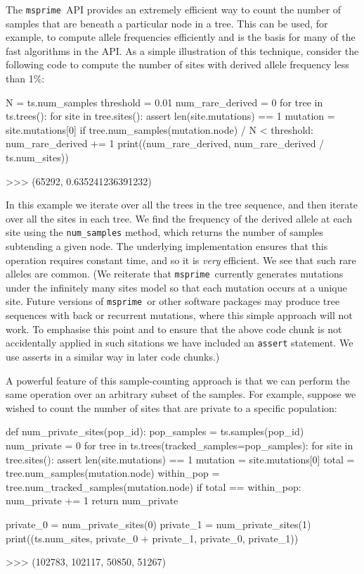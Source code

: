 \documentclass[graybox]{svmult}
\newcommand{\msprime}[0]{\texttt{msprime}}
\begin{document}
The \msprime\ API provides an extremely efficient way to count the number of samples that are beneath a particular node in a tree. This can be used,
for example, to compute allele frequencies efficiently and is the basis
for many of the fast algorithms in the API. As a simple illustration of
this technique, consider the following code to compute the number of
sites with derived allele frequency less than 1\%:

\begin{pythoncode}
N = ts.num_samples
threshold = 0.01
num_rare_derived = 0
for tree in ts.trees():
    for site in tree.sites():
        assert len(site.mutations) == 1
        mutation = site.mutations[0]
        if tree.num_samples(mutation.node) / N < threshold:
            num_rare_derived += 1
print((num_rare_derived, num_rare_derived / ts.num_sites))

>>> (65292, 0.635241236391232)
\end{pythoncode}

    In this example we iterate over all the trees in the tree sequence, and
then iterate over all the sites in each tree. We find the frequency
of the derived allele at each site using the \texttt{num\_samples}
method, which returns the number of samples subtending a given
node. The underlying implementation ensures that this operation requires
constant time, and so it is \emph{very} efficient. We see that such rare alleles are common.
(We reiterate that \msprime\ currently
generates mutations under the infinitely many sites model so that each mutation occurs at a
unique site. Future versions of \msprime\ or other software packages may produce
tree sequences with back or recurrent mutations, where
this simple approach will not work.
To emphasise this point and to ensure that the above code chunk is not
accidentally applied in such sitations we have included an
\texttt{assert} statement. We use asserts in a similar way in later
code chunks.)

A powerful feature of this sample-counting approach is that we can
perform the same operation over an arbitrary subset of the samples. For
example, suppose we wished to count the number of sites that are private
to a specific population:

\begin{pythoncode}
def num_private_sites(pop_id):
    pop_samples = ts.samples(pop_id)
    num_private = 0
    for tree in ts.trees(tracked_samples=pop_samples):
        for site in tree.sites():
            assert len(site.mutations) == 1
            mutation = site.mutations[0]
            total = tree.num_samples(mutation.node)
            within_pop = tree.num_tracked_samples(mutation.node)
            if total == within_pop:
                num_private += 1
    return num_private

private_0 = num_private_sites(0)
private_1 = num_private_sites(1)
print((ts.num_sites, private_0 + private_1, private_0, private_1))

>>> (102783, 102117, 50850, 51267)
\end{pythoncode}
\end{document}
